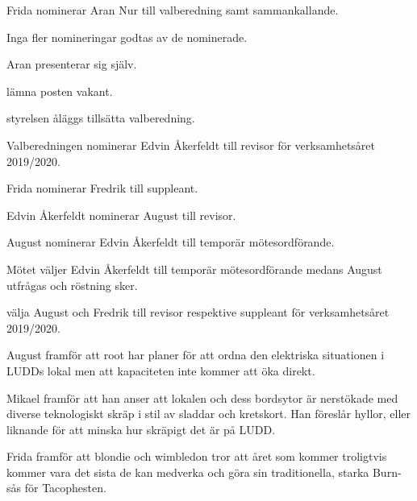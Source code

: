 \documentclass{protokoll}
\begin{document}
Frida nominerar Aran Nur till valberedning samt sammankallande. 

Inga fler nomineringar godtas av de nominerade. %

Aran presenterar sig själv. 

\begin{beslut}
  \att lämna posten vakant. 
\end{beslut}

\begin{beslut}
  \att styrelsen åläggs tillsätta valberedning.
\end{beslut}

Valberedningen nominerar Edvin Åkerfeldt till revisor för verksamhetsåret 2019/2020.

Frida nominerar Fredrik till suppleant. 

Edvin Åkerfeldt nominerar August till revisor.

August nominerar Edvin Åkerfeldt till temporär mötesordförande. 

Mötet väljer Edvin Åkerfeldt till temporär mötesordförande medans August
utfrågas och röstning sker. 

\begin{beslut}
  \att välja August och Fredrik till revisor respektive suppleant för verksamhetsåret 2019/2020.
\end{beslut}

August framför att root har planer för att ordna den elektriska situationen
i LUDDs lokal men att kapaciteten inte kommer att öka direkt.

Mikael framför att han anser att lokalen och dess bordsytor är nerstökade med 
diverse teknologiskt skräp i stil av sladdar och kretskort. Han föreslår 
hyllor, eller liknande för att minska hur skräpigt det är på LUDD.

Frida framför att blondie och wimbledon tror att året som kommer troligtvis
kommer vara det sista de kan medverka och göra sin traditionella, starka 
Burn-sås för Tacophesten.
\end{document}
